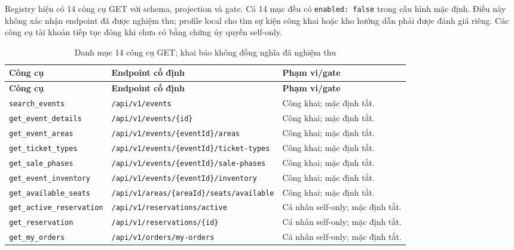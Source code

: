 Registry hiện có 14 công cụ GET với schema, projection và gate. Cả 14 mục đều có \texttt{enabled: false} trong cấu hình mặc định. Điều này không xác nhận endpoint đã được nghiệm thu; profile local cho tìm sự kiện công khai hoặc kho hướng dẫn phải được đánh giá riêng. Các công cụ tài khoản tiếp tục đóng khi chưa có bằng chứng ủy quyền self-only.

\begingroup
\footnotesize
\begin{longtable}{|L{3.7cm}|L{6.4cm}|L{4.3cm}|}
\caption{Danh mục 14 công cụ GET; khai báo không đồng nghĩa đã nghiệm thu}\label{tab:14_business_tools}\\
\hline
{}\textbf{Công cụ} & \textbf{Endpoint cố định} & \textbf{Phạm vi/gate} \\
\hline
\endfirsthead
\hline
{}\textbf{Công cụ} & \textbf{Endpoint cố định} & \textbf{Phạm vi/gate} \\
\hline
\endhead
\hline
\endfoot
\hline
\endlastfoot
\texttt{search\_\allowbreak events} & \nolinkurl{/api/v1/events} & Công khai; mặc định tắt. \\
\hline
\texttt{get\_\allowbreak event\_\allowbreak details} & \nolinkurl{/api/v1/events/{id}} & Công khai; mặc định tắt. \\
\hline
\texttt{get\_\allowbreak event\_\allowbreak areas} & \nolinkurl{/api/v1/events/{eventId}/areas} & Công khai; mặc định tắt. \\
\hline
\texttt{get\_\allowbreak ticket\_\allowbreak types} & \nolinkurl{/api/v1/events/{eventId}/ticket-types} & Công khai; mặc định tắt. \\
\hline
\texttt{get\_\allowbreak sale\_\allowbreak phases} & \nolinkurl{/api/v1/events/{eventId}/sale-phases} & Công khai; mặc định tắt. \\
\hline
\texttt{get\_\allowbreak event\_\allowbreak inventory} & \nolinkurl{/api/v1/events/{eventId}/inventory} & Công khai; mặc định tắt. \\
\hline
\texttt{get\_\allowbreak available\_\allowbreak seats} & \nolinkurl{/api/v1/areas/{areaId}/seats/available} & Công khai; mặc định tắt. \\
\hline
\texttt{get\_\allowbreak active\_\allowbreak reservation} & \nolinkurl{/api/v1/reservations/active} & Cá nhân self-only; mặc định tắt. \\
\hline
\texttt{get\_\allowbreak reservation} & \nolinkurl{/api/v1/reservations/{id}} & Cá nhân self-only; mặc định tắt. \\
\hline
\texttt{get\_\allowbreak my\_\allowbreak orders} & \nolinkurl{/api/v1/orders/my-orders} & Cá nhân self-only; mặc định tắt. \\

\end{longtable}
